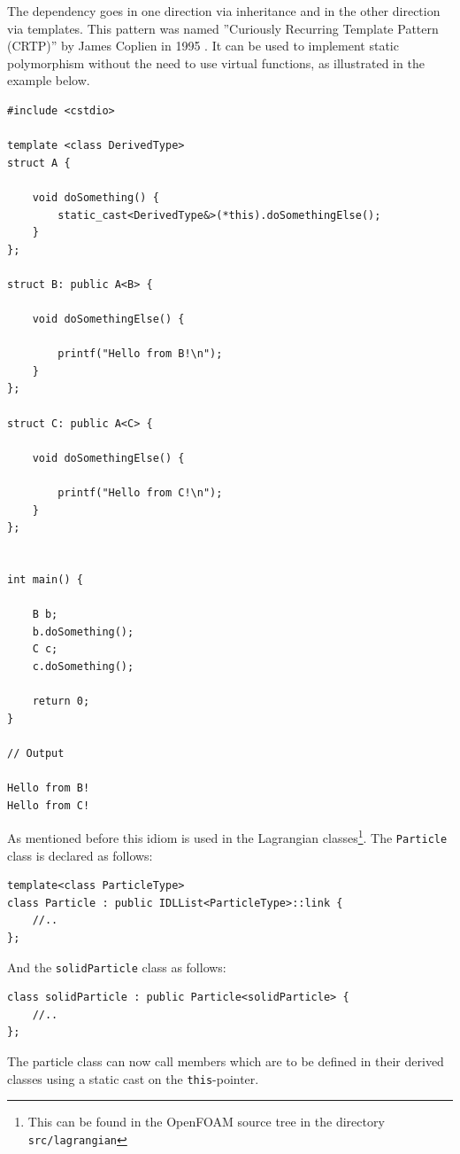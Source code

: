 
The dependency goes in one direction via inheritance and in the other direction via templates. This pattern was named ''Curiously Recurring Template Pattern (CRTP)'' by James Coplien in 1995 \cite{coplien95}. It can be used to implement static polymorphism without the need to use virtual functions, as illustrated in the example below.

\begin{lstlisting}
#include <cstdio>

template <class DerivedType>
struct A {

    void doSomething() {
        static_cast<DerivedType&>(*this).doSomethingElse();
    }
};

struct B: public A<B> {

    void doSomethingElse() {
        
        printf("Hello from B!\n");
    }
};

struct C: public A<C> {
    
    void doSomethingElse() {
        
        printf("Hello from C!\n");
    }
};


int main() {
    
    B b;
    b.doSomething();
    C c;
    c.doSomething();
    
    return 0;
}

// Output

Hello from B!
Hello from C!

\end{lstlisting}

As mentioned before this idiom is used in the Lagrangian classes\footnote{This can be found in the OpenFOAM source tree in the directory \verb+src/lagrangian+}. The \verb+Particle+ class is declared as follows:

\begin{lstlisting}
template<class ParticleType>
class Particle : public IDLList<ParticleType>::link {
    //..
};
\end{lstlisting}

And the \verb+solidParticle+ class as follows:

\begin{lstlisting}
class solidParticle : public Particle<solidParticle> {
    //..
};
\end{lstlisting}

The particle class can now call members which are to be defined in their derived classes using a static cast on the \verb+this+-pointer.

